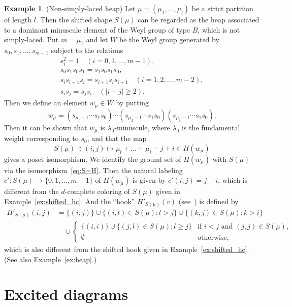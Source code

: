 \documentclass[10pt]{amsart}
\theoremstyle{definition}
\newtheorem{exam}[theo]{Example}
\theoremstyle{remark}
\begin{document}
\begin{exam} (Non-simply-laced heap)
\label{ex:shifted-B}
Let $\mu = (\mu_1, \dots, \mu_l)$ be a strict partition of length $l$.
Then the shifted shape $S(\mu)$ can be regarded as 
the heap associated to a dominant minuscule element of the Weyl group of type $B$,
which is not simply-laced.
Put $m = \mu_1$ and let $W$ be the Weyl group generated by $s_0, s_1, \dots, s_{m-1}$ 
subject to the relations
\begin{gather*}
s_i^2 = 1 \quad(i=0, 1, \dots, m-1),
\\
s_0 s_1 s_0 s_1 = s_1 s_0 s_1 s_0,
\\
s_i s_{i+1} s_i = s_{i+1} s_i s_{i+1} \quad(i=1, 2, \dots, m-2),
\\
s_i s_j = s_j s_i \quad(|i-j| \ge 2).
\end{gather*}
Then we define an element $w_\mu \in W$ by putting
$$
w_\mu = (s_{\mu_l-1} \cdots s_1 s_0) \cdots (s_{\mu_2-1} \cdots s_1 s_0) (s_{\mu_1-1} \cdots s_1 s_0).
$$
Then it can be shown that $w_\mu$ is $\lambda_0$-minuscule, where $\lambda_0$ is the fundamental weight 
corresponding to $s_0$, and that the map
\begin{equation}
\label{eq:S=H}
S(\mu) \ni (i,j) \mapsto \mu_l + \dots + \mu_i - j + i \in H(w_\mu)
\end{equation}
gives a poset isomorphism.
We identify the ground set of $H(w_\mu)$ with $S(\mu)$ via the isomorphism~\eqref{eq:S=H}.
Then the natural labeling $c' : S(\mu) \to \{ 0, 1, \dots, m-1 \}$ of $H(w_\mu)$ is given by 
$c'(i,j) = j-i$, which is different from the $d$-complete coloring of $S(\mu)$ given 
in Example~\ref{ex:shifted_hc}.
And the ``hook'' $H'_{S(\mu)}(v)$ (see~\cite[Definition~4.8]{N2}) is defined by
\begin{align*}
H'_{S(\mu)}(i,j)
 &=
\{ (i,j) \}
 \cup
\{ (i,l) \in S(\mu) : l > j \}
 \cup
\{ (k,j) \in S(\mu) : k > i \}
\\
 &\quad
\cup
\begin{cases}
 \{ (i,i) \} \cup \{ (j,l) \in S(\mu) : l \ge j \} &\text{if $i<j$ and $(j,j) \in S(\mu)$,} \\
 \emptyset &\text{otherwise,}
\end{cases}
\end{align*}
which is also different from the shifted hook given in Example~\ref{ex:shifted_hc}.
(See also Example~\ref{ex:heap}.)
\end{exam}

\section{%
Excited diagrams
}\label{sect3}
\end{document}
